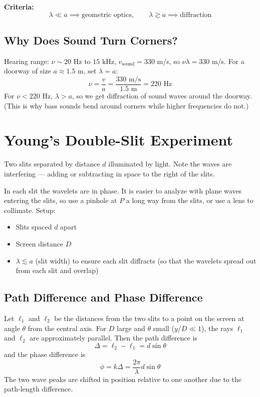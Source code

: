 \documentclass[11pt]{report}
\begin{document}
\textbf{Criteria:}
\begin{equation}
\boxed{\lambda \ll a \implies \text{geometric optics}, \qquad \lambda \gtrsim a \implies \text{diffraction}}
\end{equation}

\subsection*{Why Does Sound Turn Corners?}

Hearing range: $\nu \sim 20\text{ Hz}$ to $15\text{ kHz}$, $v_{\text{sound}} = 330$ m/s, so $\nu\lambda = 330$ m/s. For a doorway of size $a \approx 1.5$ m, set $\lambda = a$:
\begin{equation}
\nu = \frac{v}{a} = \frac{330\text{ m/s}}{1.5\text{ m}} = 220\text{ Hz}
\end{equation}
For $\nu < 220$ Hz, $\lambda > a$, so we get diffraction of sound waves around the doorway. (This is why bass sounds bend around corners while higher frequencies do not.)

\section{Young's Double-Slit Experiment}

Two slits separated by distance $d$ illuminated by light. Note the waves are interfering --- adding or subtracting in space to the right of the slits.

In each slit the wavelets are in phase. It is easier to analyze with plane waves entering the slits, so use a pinhole at $P$ a long way from the slits, or use a lens to collimate. Setup:
\begin{itemize}
    \item Slits spaced $d$ apart
    \item Screen distance $D$
    \item $\lambda \lesssim a$ (slit width) to ensure each slit diffracts (so that the wavelets spread out from each slit and overlap)
\end{itemize}

\subsection*{Path Difference and Phase Difference}

Let $\ell_1$ and $\ell_2$ be the distances from the two slits to a point on the screen at angle $\theta$ from the central axis. For $D$ large and $\theta$ small ($y/D \ll 1$), the rays $\ell_1$ and $\ell_2$ are approximately parallel. Then the path difference is
\begin{equation}
\Delta = \ell_2 - \ell_1 = d\sin\theta
\end{equation}
and the phase difference is
\begin{equation}
\boxed{\phi = k\Delta = \frac{2\pi}{\lambda}d\sin\theta}
\end{equation}
The two wave peaks are shifted in position relative to one another due to the path-length difference.
\end{document}
